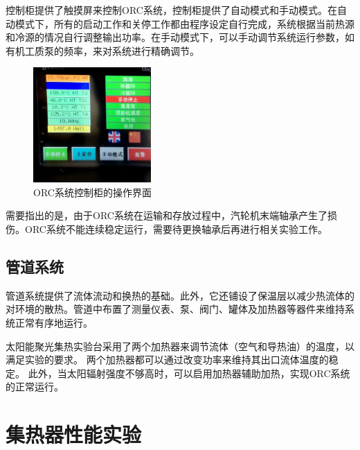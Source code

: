 控制柜提供了触摸屏来控制ORC系统，控制柜提供了自动模式和手动模式。在自动模式下，所有的启动工作和关停工作都由程序设定自行完成，系统根据当前热源和冷源的情况自行调整输出功率。在手动模式下，可以手动调节系统运行参数，如有机工质泵的频率，来对系统进行精确调节。

\begin{figure}[!ht]
\centering
\includegraphics[width=0.4\textwidth]{fig/ControlCabinet}
\caption{ORC系统控制柜的操作界面}\label{fig:ControlCabinet}
\end{figure}

需要指出的是，由于ORC系统在运输和存放过程中，汽轮机末端轴承产生了损伤。ORC系统不能连续稳定运行，需要待更换轴承后再进行相关实验工作。

\subsection{管道系统}

管道系统提供了流体流动和换热的基础。此外，它还铺设了保温层以减少热流体的对环境的散热。管道中布置了测量仪表、泵、阀门、罐体及加热器等器件来维持系统正常有序地运行。

太阳能聚光集热实验台采用了两个加热器来调节流体（空气和导热油）的温度，以满足实验的要求。
两个加热器都可以通过改变功率来维持其出口流体温度的稳定。
此外，当太阳辐射强度不够高时，可以启用加热器辅助加热，实现ORC系统的正常运行。

\section{集热器性能实验}


